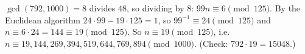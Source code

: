 $\gcd(792,1000)=8$ divides $48$, so dividing by $8$: $99n\equiv6\pmod{125}$. By the Euclidean algorithm $24\cdot99-19\cdot125=1$, so $99^{-1}\equiv24\pmod{125}$ and $n\equiv6\cdot24=144\equiv19\pmod{125}$. So $\boxed{n\equiv19\pmod{125}}$, i.e. $n\equiv19,144,269,394,519,644,769,894\pmod{1000}$. (Check: $792\cdot19=15048$.)

